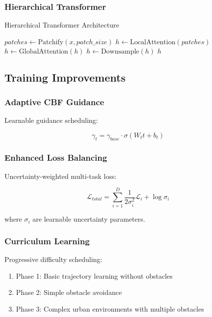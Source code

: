 \documentclass[12pt]{article}
\begin{document}
\subsubsection{Hierarchical Transformer}

\begin{algorithm}
\caption{Hierarchical Transformer Architecture}
\begin{algorithmic}[1]
\State $patches \gets \text{Patchify}(x, patch\_size)$
\State $h \gets \text{LocalAttention}(patches)$
\State $h \gets \text{GlobalAttention}(h)$
\State $h \gets \text{Downsample}(h)$
\EndFor
\Return $h$
\EndProcedure
\end{algorithmic}
\end{algorithm}

\subsection{Training Improvements}

\subsubsection{Adaptive CBF Guidance}

Learnable guidance scheduling:

\begin{equation}
\gamma_t = \gamma_{base} \cdot \sigma(W_t t + b_t)
\end{equation}

\subsubsection{Enhanced Loss Balancing}

Uncertainty-weighted multi-task loss:

\begin{equation}
\mathcal{L}_{total} = \sum_{i=1}^{D} \frac{1}{2\sigma_i^2} \mathcal{L}_i + \log \sigma_i
\end{equation}

where $\sigma_i$ are learnable uncertainty parameters.

\subsubsection{Curriculum Learning}

Progressive difficulty scheduling:

\begin{enumerate}
    \item Phase 1: Basic trajectory learning without obstacles
    \item Phase 2: Simple obstacle avoidance
    \item Phase 3: Complex urban environments with multiple obstacles
\end{enumerate}
\end{document}
